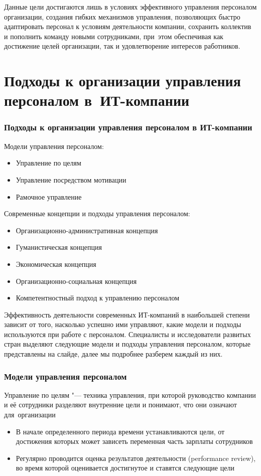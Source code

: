 \documentclass{../industrial-development}
\begin{document}
Данные цели достигаются лишь в условиях эффективного управления персоналом организации, создания гибких механизмов управления, позволяющих быстро адаптировать персонал к условиям деятельности компании, сохранить  коллектив и пополнить команду новыми сотрудниками, при~этом обеспечивая как достижение целей организации, так и удовлетворение интересов работников.

\section{Подходы к организации управления персоналом в~ИТ-компании}

\begin{frame} \frametitle{Подходы к организации управления персоналом в ИТ-компании}
	Модели управления персоналом:
	\begin{itemize}
		\item Управление по целям
		\item Управление посредством мотивации
		\item Рамочное управление
	\end{itemize}
	Современные концепции и подходы управления персоналом:
	\begin{itemize}
		\item Организационно-административная концепция 
		\item Гуманистическая концепция
		\item Экономическая концепция
		\item Организационно-социальная концепция
		\item Компетентностный подход к управлению персоналом
	\end{itemize}
\end{frame}
\lecturenotes

Эффективность деятельности современных ИТ-компаний в наибольшей степени зависит от того, насколько успешно ими управляют, какие модели и подходы используются при работе с персоналом. Специалисты и исследователи развитых стран выделяют следующие модели и подходы управления персоналом, которые представлены на слайде, далее мы подробнее разберем каждый из них.

\begin{frame} \frametitle{Модели управления персоналом}
	\alert{Управление по целям} "--- техника управления, при которой руководство компании и её сотрудники разделяют внутренние цели и понимают, что они означают для~организации
	\begin{itemize}
		\item В начале определенного периода времени устанавливаются цели, от достижения которых может зависеть переменная часть зарплаты сотрудников
		\item Регулярно проводится оценка результатов деятельности (performance review), во время которой оценивается достигнутое и ставятся следующие цели
	\end{itemize}
\end{frame}
\lecturenotes
\end{document}
